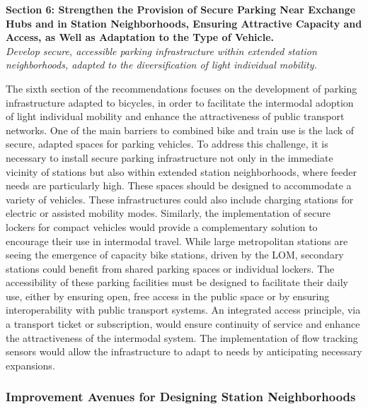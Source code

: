 \begin{refsegment}
    \begin{displayquote}
\textbf{Section 6: Strengthen the Provision of Secure Parking Near Exchange Hubs and in Station Neighborhoods, Ensuring Attractive Capacity and Access, as Well as Adaptation to the Type of Vehicle.}
\\
\textsl{Develop secure, accessible parking infrastructure within extended station neighborhoods, adapted to the diversification of light individual mobility.}
    \end{displayquote}
The sixth section of the recommendations focuses on the development of parking infrastructure adapted to bicycles, in order to facilitate the intermodal adoption of light individual mobility and enhance the attractiveness of public transport networks. One of the main barriers to combined bike and train use is the lack of secure, adapted spaces for parking vehicles. To address this challenge, it is necessary to install secure parking infrastructure not only in the immediate vicinity of stations but also within extended station neighborhoods, where feeder needs are particularly high. These spaces should be designed to accommodate a variety of vehicles. These infrastructures could also include charging stations for electric or assisted mobility modes. Similarly, the implementation of secure lockers for compact vehicles would provide a complementary solution to encourage their use in intermodal travel. While large metropolitan stations are seeing the emergence of capacity bike stations, driven by the \acrfull{LOM}, secondary stations could benefit from shared parking spaces or individual lockers. The accessibility of these parking facilities must be designed to facilitate their daily use, either by ensuring open, free access in the \gls{public space} or by ensuring interoperability with public transport systems. An integrated access principle, via a transport ticket or subscription, would ensure continuity of service and enhance the attractiveness of the intermodal system. The implementation of flow tracking sensors would allow the infrastructure to adapt to needs by anticipating necessary expansions.%

\subsubsection*{Improvement Avenues for Designing Station Neighborhoods
    \label{conclusion-generale:implications-amenagement}
    }


\end{refsegment}
